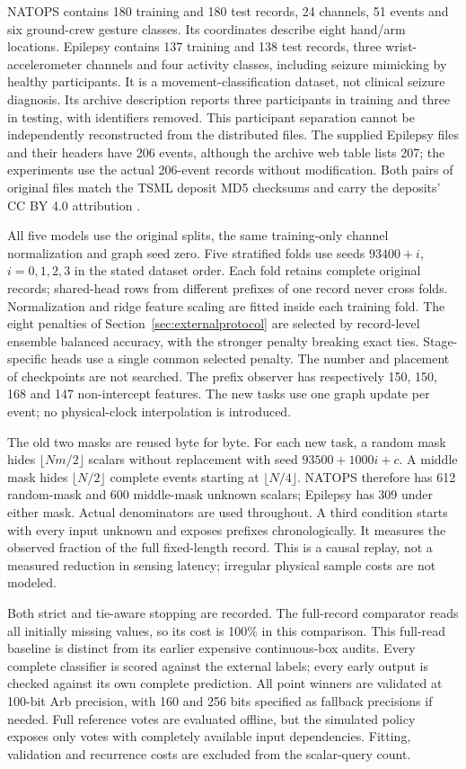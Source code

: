 \documentclass[11pt,a4paper]{article}
\theoremstyle{definition}\newtheorem{definition}[theorem]{Definition}
\begin{document}
NATOPS contains 180 training and 180 test records, 24 channels, 51 events and six ground-crew gesture classes. Its coordinates describe eight hand/arm locations. Epilepsy contains 137 training and 138 test records, three wrist-accelerometer channels and four activity classes, including seizure mimicking by healthy participants. It is a movement-classification dataset, not clinical seizure diagnosis. Its archive description reports three participants in training and three in testing, with identifiers removed. This participant separation cannot be independently reconstructed from the distributed files. The supplied Epilepsy files and their headers have 206 events, although the archive web table lists 207; the experiments use the actual 206-event records without modification. Both pairs of original files match the TSML deposit MD5 checksums and carry the deposits' CC BY 4.0 attribution \cite{natopsdata,epilepsydata}.

All five models use the original splits, the same training-only channel normalization and graph seed zero. Five stratified folds use seeds $93400+i$, $i=0,1,2,3$ in the stated dataset order. Each fold retains complete original records; shared-head rows from different prefixes of one record never cross folds. Normalization and ridge feature scaling are fitted inside each training fold. The eight penalties of Section~\ref{sec:externalprotocol} are selected by record-level ensemble balanced accuracy, with the stronger penalty breaking exact ties. Stage-specific heads use a single common selected penalty. The number and placement of checkpoints are not searched. The prefix observer has respectively 150, 150, 168 and 147 non-intercept features. The new tasks use one graph update per event; no physical-clock interpolation is introduced.

The old two masks are reused byte for byte. For each new task, a random mask hides $\lfloor Nm/2\rfloor$ scalars without replacement with seed $93500+1000i+c$. A middle mask hides $\lfloor N/2\rfloor$ complete events starting at $\lfloor N/4\rfloor$. NATOPS therefore has 612 random-mask and 600 middle-mask unknown scalars; Epilepsy has 309 under either mask. Actual denominators are used throughout. A third condition starts with every input unknown and exposes prefixes chronologically. It measures the observed fraction of the full fixed-length record. This is a causal replay, not a measured reduction in sensing latency; irregular physical sample costs are not modeled.

Both strict and tie-aware stopping are recorded. The full-record comparator reads all initially missing values, so its cost is 100\% in this comparison. This full-read baseline is distinct from its earlier expensive continuous-box audits. Every complete classifier is scored against the external labels; every early output is checked against its own complete prediction. All point winners are validated at 100-bit Arb precision, with 160 and 256 bits specified as fallback precisions if needed. Full reference votes are evaluated offline, but the simulated policy exposes only votes with completely available input dependencies. Fitting, validation and recurrence costs are excluded from the scalar-query count.
\end{document}
